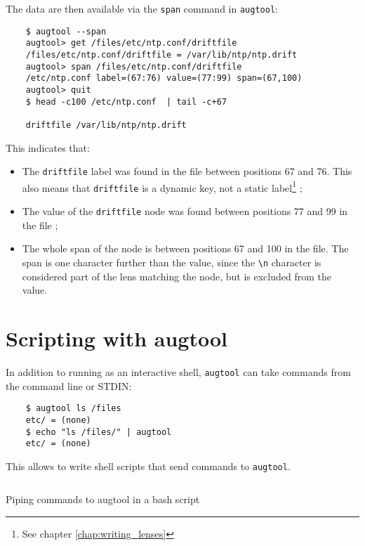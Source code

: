 The data are then available via the \verb!span! command in \verb!augtool!:


\begin{verbatim}
    $ augtool --span
    augtool> get /files/etc/ntp.conf/driftfile
    /files/etc/ntp.conf/driftfile = /var/lib/ntp/ntp.drift
    augtool> span /files/etc/ntp.conf/driftfile
    /etc/ntp.conf label=(67:76) value=(77:99) span=(67,100)
    augtool> quit
    $ head -c100 /etc/ntp.conf  | tail -c+67

    driftfile /var/lib/ntp/ntp.drift
\end{verbatim}

This indicates that:

\begin{itemize}
\item
  The \verb!driftfile! label was found in the file between positions 67 and 76. This also means that \verb!driftfile! is a dynamic key, not a static label\footnote{See chapter \ref{chap:writing_lenses}} ;
\item
  The value of the \verb!driftfile! node was found between positions 77 and 99 in the file ;
\item
  The whole span of the node is between positions 67 and 100 in the file. The span is one character further than the value, since the \verb!\n! character is considered part of the lens matching the node, but is excluded from the value.
\end{itemize}
\section{Scripting with augtool}


In addition to running as an interactive shell, \verb!augtool! can take commands from the command line or STDIN:

 

\begin{verbatim}
    $ augtool ls /files
    etc/ = (none)
    $ echo "ls /files/" | augtool
    etc/ = (none)
\end{verbatim}

This allows to write shell scripts that send commands to \verb!augtool!.

  

\begin{listing}[H]
  \inputminted[linenos,frame=leftline]{bash}{listings/augtool_wrap.sh}
  \caption{Piping commands to augtool in a bash script}
  \label{lst:augtool_wrap}
\end{listing}

